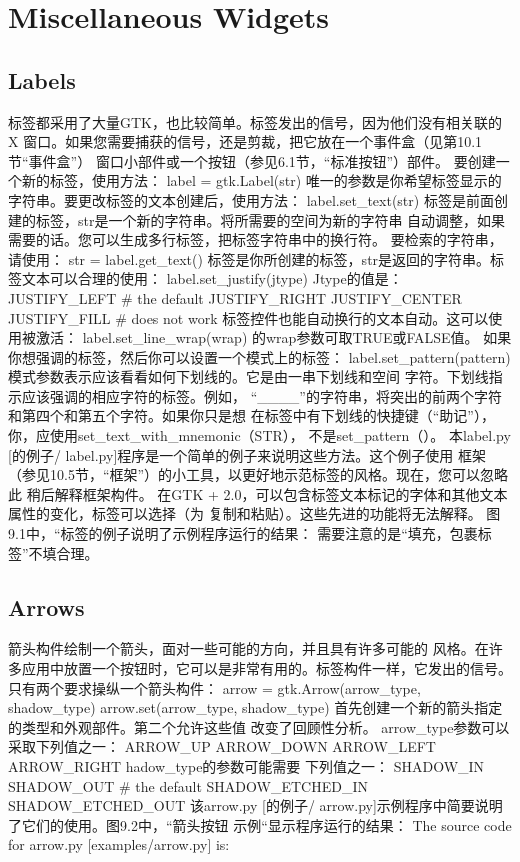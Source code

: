 \chapter{Miscellaneous Widgets}
\section{Labels}
标签都采用了大量GTK，也比较简单。标签发出的信号，因为他们没有相关联的X
窗口。如果您需要捕获的信号，还是剪裁，把它放在一个事件盒（见第10.1节“事件盒”）
窗口小部件或一个按钮（参见6.1节，“标准按钮”）部件。
要创建一个新的标签，使用方法：
label = gtk.Label(str)
唯一的参数是你希望标签显示的字符串。要更改标签的文本创建后，使用方法：	
label.set_text(str)
标签是前面创建的标签，str是一个新的字符串。将所需要的空间为新的字符串
自动调整，如果需要的话。您可以生成多行标签，把标签字符串中的换行符。
要检索的字符串，请使用：
str = label.get_text()
标签是你所创建的标签，str是返回的字符串。标签文本可以合理的使用：
label.set_justify(jtype)
Jtype的值是：
JUSTIFY_LEFT # the default
JUSTIFY_RIGHT
JUSTIFY_CENTER
JUSTIFY_FILL # does not work
标签控件也能自动换行的文本自动。这可以使用被激活：
label.set_line_wrap(wrap)
的wrap参数可取TRUE或FALSE值。
如果你想强调的标签，然后你可以设置一个模式上的标签：
label.set_pattern(pattern)
模式参数表示应该看看如何下划线的。它是由一串下划线和空间
字符。下划线指示应该强调的相应字符的标签。例如，
“____”的字符串，将突出的前两个字符和第四个和第五个字符。如果你只是想
在标签中有下划线的快捷键（“助记”），你，应使用set_text_with_mnemonic（STR），
不是set_pattern（）。
本label.py [的例子/ label.py]程序是一个简单的例子来说明这些方法。这个例子使用
框架（参见10.5节，“框架”）的小工具，以更好地示范标签的风格。现在，您可以忽略此
稍后解释框架构件。
在GTK + 2.0，可以包含标签文本标记的字体和其他文本属性的变化，标签可以选择（为
复制和粘贴）。这些先进的功能将无法解释。
图9.1中，“标签的例子说明了示例程序运行的结果：
需要注意的是“填充，包裹标签”不填合理。
\section{Arrows}
箭头构件绘制一个箭头，面对一些可能的方向，并且具有许多可能的
风格。在许多应用中放置一个按钮时，它可以是非常有用的。标签构件一样，它发出的信号。
只有两个要求操纵一个箭头构件：	
arrow = gtk.Arrow(arrow_type, shadow_type)
arrow.set(arrow_type, shadow_type)
首先创建一个新的箭头指定的类型和外观部件。第二个允许这些值
改变了回顾性分析。 arrow_type参数可以采取下列值之一：
ARROW_UP
ARROW_DOWN
ARROW_LEFT
ARROW_RIGHT
hadow_type的参数可能需要
下列值之一：
SHADOW_IN
SHADOW_OUT # the default
SHADOW_ETCHED_IN
SHADOW_ETCHED_OUT
该arrow.py [的例子/ arrow.py]示例程序中简要说明了它们的使用。图9.2中，“箭头按钮
示例“显示程序运行的结果：	
The source code for arrow.py [examples/arrow.py] is:
